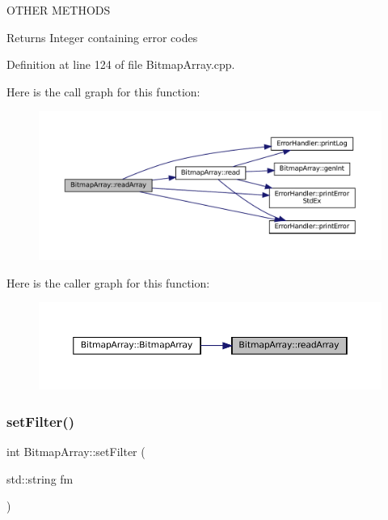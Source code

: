O\+T\+H\+ER M\+E\+T\+H\+O\+DS\begin{DoxyReturn}{Returns}
Integer containing error codes 
\end{DoxyReturn}


Definition at line 124 of file Bitmap\+Array.\+cpp.

Here is the call graph for this function\+:\nopagebreak
\begin{figure}[H]
\begin{center}
\leavevmode
\includegraphics[width=350pt]{classBitmapArray_a4ce4b5acc896040075be63a559799e7e_cgraph}
\end{center}
\end{figure}
Here is the caller graph for this function\+:\nopagebreak
\begin{figure}[H]
\begin{center}
\leavevmode
\includegraphics[width=350pt]{classBitmapArray_a4ce4b5acc896040075be63a559799e7e_icgraph}
\end{center}
\end{figure}
\mbox{\label{classBitmapArray_a432bda57a77788bfd54e3310c9e83c0c}} 
\subsubsection{\texorpdfstring{setFilter()}{setFilter()}}
{\footnotesize\ttfamily int Bitmap\+Array\+::set\+Filter (\begin{DoxyParamCaption}\item[{std\+::string}]{fm }\end{DoxyParamCaption})}



